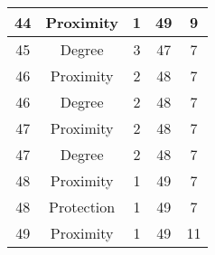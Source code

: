 \documentclass[results.tex]{subfiles}
\begin{document}
\begin{center}
\begin{tabular}{| c || c | c | c | c |}
            \hline
            44                      & Proximity                    & 1                      & 49                      & 9                    \\
            \hline
            45                      & Degree                       & 3                      & 47                      & 7                    \\
            \hline
            46                      & Proximity                    & 2                      & 48                      & 7                    \\
            \hline
            46                      & Degree                       & 2                      & 48                      & 7                    \\
            \hline
            47                      & Proximity                    & 2                      & 48                      & 7                    \\
            \hline
            47                      & Degree                       & 2                      & 48                      & 7                    \\
            \hline
            48                      & Proximity                    & 1                      & 49                      & 7                    \\
            \hline
            48                      & Protection                   & 1                      & 49                      & 7                    \\
            \hline
            49                      & Proximity                    & 1                      & 49                      & 11                   \\
            \hline
        \end{tabular}
    \end{center}
\end{document}
